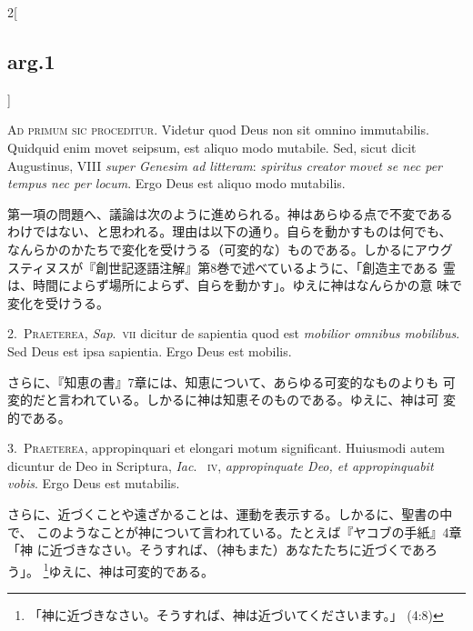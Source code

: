 \documentclass[paper=a4paper,fontsize=10pt,jafontsize=9pt,titlepage]{jlreq}
\begin{document}
\begin{paracol}{2}[\subsection{arg.1}]

{\huge A}{\scshape d primum sic proceditur}. Videtur quod Deus non sit
omnino immutabilis.  Quidquid enim movet seipsum, est aliquo modo
mutabile. Sed, sicut dicit Augustinus, VIII {\itshape super Genesim ad
litteram}:  {\itshape spiritus creator movet se nec per tempus nec per
locum}. Ergo Deus est aliquo modo mutabilis.

\switchcolumn

第一項の問題へ、議論は次のように進められる。神はあらゆる点で不変である
わけではない、と思われる。理由は以下の通り。自らを動かすものは何でも、
なんらかのかたちで変化を受けうる（可変的な）ものである。しかるにアウグ
スティヌスが『創世記逐語注解』第8巻で述べているように、「創造主である
霊は、時間によらず場所によらず、自らを動かす」。ゆえに神はなんらかの意
味で変化を受けうる。


2.~{\scshape Praeterea}, {\itshape Sap}.~{\scshape vii} dicitur de
sapientia quod est {\itshape mobilior omnibus mobilibus}. Sed Deus est
ipsa sapientia. Ergo Deus est mobilis.

\switchcolumn

さらに、『知恵の書』7章には、知恵について、あらゆる可変的なものよりも
可変的だと言われている。しかるに神は知恵そのものである。ゆえに、神は可
変的である。


3.~{\scshape Praeterea}, appropinquari et elongari motum significant.
 Huiusmodi autem dicuntur de Deo in Scriptura, {\itshape Iac}.~{\scshape
 iv}, {\itshape appropinquate Deo, et appropinquabit vobis}. Ergo Deus
 est mutabilis.

\switchcolumn

さらに、近づくことや遠ざかることは、運動を表示する。しかるに、聖書の中で、
 このようなことが神について言われている。たとえば『ヤコブの手紙』4章「神
 に近づきなさい。そうすれば、（神もまた）あなたたちに近づくであろう」。
 \footnote{「神に近づきなさい。そうすれば、神は近づいてくださいます。」
 (4:8)}ゆえに、神は可変的である。


\end{paracol}
\end{document}
